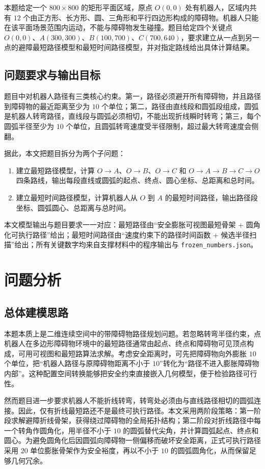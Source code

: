 \documentclass[UTF8,a4paper,12pt]{ctexart}
\begin{document}
本题给定一个 $800\times 800$ 的矩形平面区域，原点 $O(0,0)$ 处有机器人，区域内共有 $12$ 个由正方形、长方形、圆、三角形和平行四边形构成的障碍物。机器人只能在该平面场景范围内运动，不能与障碍物发生碰撞。题目给定四个关键点 $O(0,0)$、$A(300,300)$、$B(100,700)$、$C(700,640)$，要求建立从一点到另一点的避障最短路径模型和最短时间路径模型，并对指定路线给出具体计算结果。

\subsection{问题要求与输出目标}
题目中对机器人路径有三类核心约束。第一，路径必须避开所有障碍物，并且路径到障碍物的最近距离至少为 $10$ 个单位；第二，路径由直线段和圆弧段组成，圆弧是机器人转弯路径，直线段与圆弧必须相切，不能出现折线瞬时转弯；第三，每个圆弧半径至少为 $10$ 个单位，且圆弧转弯速度受半径限制，超过最大转弯速度会侧翻。

据此，本文把题目拆分为两个子问题：
\begin{enumerate}[label=(\arabic*)]
    \item 建立最短路径模型，计算 $O\to A$、$O\to B$、$O\to C$ 和 $O\to A\to B\to C\to O$ 四条路线，输出每段直线或圆弧的起点、终点、圆心坐标、总距离和总时间。
    \item 建立最短时间路径模型，计算机器人从 $O$ 到 $A$ 的最短时间路径，输出路径段坐标、圆弧圆心、总距离与总时间。
\end{enumerate}
本文模型输出与题目要求一一对应：最短路径由“安全膨胀可视图最短骨架 + 圆角化可执行路径”给出；最短时间路径由“速度约束下的路径时间函数 + 候选半径扫描”给出；所有关键数字均来自支撑材料中的程序输出与 \texttt{frozen\_numbers.json}。

\section{问题分析}
\subsection{总体建模思路}
本题本质上是二维连续空间中的带障碍物路径规划问题。若忽略转弯半径约束，点机器人在多边形障碍物环境中的最短路径通常由起点、终点和障碍物可见顶点构成，可用可视图和最短路算法求解。考虑安全距离时，可先把障碍物向外膨胀 $10$ 个单位，把“机器人路径与原障碍物距离不小于 $10$”转化为“路径不进入膨胀障碍物内部”。这种配置空间转换能够把安全约束直接嵌入几何模型，便于检验路径可行性。

然而题目进一步要求机器人不能折线转弯，转弯处必须由与直线路径相切的圆弧连接。因此，仅有折线最短路还不是最终可执行路径。本文采用两阶段策略：第一阶段求解避障折线骨架，获得绕过障碍物的全局拓扑结构；第二阶段对折线路径中每一个转角作圆角化，用半径不小于 $10$ 的圆弧替代尖角，并计算圆弧起点、终点和圆心。为避免圆角化后因圆弧向障碍物一侧偏移而破坏安全距离，正式可执行路径采用 $20$ 单位膨胀骨架作为安全裕度，再以不小于 $10$ 的圆弧圆角化，从而保留足够几何冗余。
\end{document}
